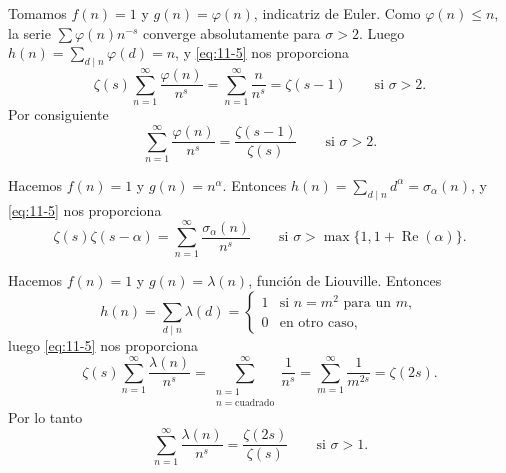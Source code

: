 \documentclass[12pt,a4paper]{book}
\begin{document}
    \begin{ejemplo}
        Tomamos $f(n)=1$ y $g(n)=\varphi(n)$, indicatriz de Euler. Como $\varphi(n)\leq n$, la
        serie $\sum\varphi(n)n^{-s}$ converge absolutamente para $\sigma>2$. Luego
        $h(n)=\sum_{d\mid n}\varphi(d)=n$, y \eqref{eq:11-5} nos proporciona
        \begin{equation*}
            \zeta(s)\sum_{n=1}^{\infty}\frac{\varphi(n)}{n^{s}}=\sum_{n=1}^{\infty}\frac{n}{n^{s}}=\zeta(s-1)\qquad\text{si }\sigma>2.
        \end{equation*}
        Por consiguiente
        \begin{equation*}
            \sum_{n=1}^{\infty}\frac{\varphi(n)}{n^{s}}=\frac{\zeta(s-1)}{\zeta(s)}\qquad\text{si }\sigma>2.
        \end{equation*}
    \end{ejemplo}

    \begin{ejemplo}
        Hacemos $f(n)=1$ y $g(n)=n^{\alpha}$. Entonces $h(n)=\sum_{d\mid n}d^{\alpha}=\sigma_{\alpha}(n)$, y
        \eqref{eq:11-5} nos proporciona
        \begin{equation*}
            \zeta(s)\zeta(s-\alpha)=\sum_{n=1}^{\infty}\frac{\sigma_{\alpha}(n)}{n^{s}}\qquad\text{si }\sigma>\max\{1,1+\operatorname{Re}(\alpha)\}.
        \end{equation*}
    \end{ejemplo}

    \begin{ejemplo}
        Hacemos $f(n)=1$ y $g(n)=\lambda(n)$, función de Liouville. Entonces
        \begin{equation*}
            h(n)=\sum_{d\mid n}\lambda(d)=
            \begin{cases}
                1&\text{si }n=m^{2}\text{ para un }m,\\
                0&\text{en otro caso,}
            \end{cases}
        \end{equation*}
        luego \eqref{eq:11-5} nos proporciona
        \begin{equation*}
            \zeta(s)\sum_{n=1}^{\infty}\frac{\lambda(n)}{n^{s}}=\sum_{\substack{n=1\\n=\text{cuadrado}}}^{\infty}\frac{1}{n^{s}}=\sum_{m=1}^{\infty}\frac{1}{m^{2s}}=\zeta(2s).
        \end{equation*}
        Por lo tanto
        \begin{equation*}
            \sum_{n=1}^{\infty}\frac{\lambda(n)}{n^{s}}=\frac{\zeta(2s)}{\zeta(s)}\qquad\text{si }\sigma>1.
        \end{equation*}
    \end{ejemplo}
\end{document}

